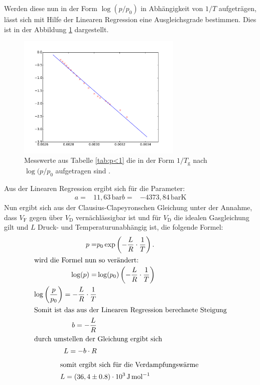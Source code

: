 Werden diese nun in der Form $\log(p/p_\mathrm{0})$ in Abhängigkeit von
$1/T$ aufgeträgen,
lässt sich mit Hilfe der Linearen Regression eine
Ausgleichsgrade bestimmen.
Dies ist in der Abbildung \ref{abb:plot1} dargestellt.
\begin{figure}
  \centering
  \includegraphics[width=0.7\textwidth]{plot1.pdf}
  \caption{Messwerte aus Tabelle \ref{tab:p<1} die in der Form $1/T_\mathrm{g}$ nach $\log(p/p_\mathrm{0}$ aufgetragen sind . }
  \label{abb:plot1}
\end{figure}
Aus der Linearen Regression ergibt sich für die Parameter:
\begin{align*}
  a=& 11,63\,\si{\bar}
  b=&  -4373,84\,\si{\bar\kelvin}
\end{align*}
Nun ergibt sich aus der Clausius-Clapeyronschen Gleichung
unter der Annahme, dass $V_\mathrm{F}$ gegen über
$V_\mathrm{D}$ vernächlässigbar ist und  für $V_\mathrm{D}$
die idealen Gasgleichung gilt und $L$ Druck- und
Temperaturunabhängig ist, die folgende Formel:
\begin{align}
  p=&p_\mathrm{0}\exp\left(-\frac{L}{R}\cdot\frac{1}{T}\right).\\
\intertext{wird die Formel nun so verändert:}
\log(p)=& \log(p_\mathrm{0})\left(-\frac{L}{R}\cdot\frac{1}{T}\right)\\
\log\left(\frac{p}{p_\mathrm{0}}\right)=-\frac{L}{R}\cdot\frac{1}{T}\\
\intertext{Somit ist das aus der Linearen Regression berechnete Steigung}
b=-\frac{L}{R}\\
\intertext{durch umstellen der Gleichung ergibt sich}
L=-b\cdot R\\
\end{align}
\begin{align*}
\intertext{somit ergibt sich für die Verdampfungswärme }
L=(36,4\pm0.8)\cdot 10^3 \,\si{\joule\per\mol}
\end{align*}

